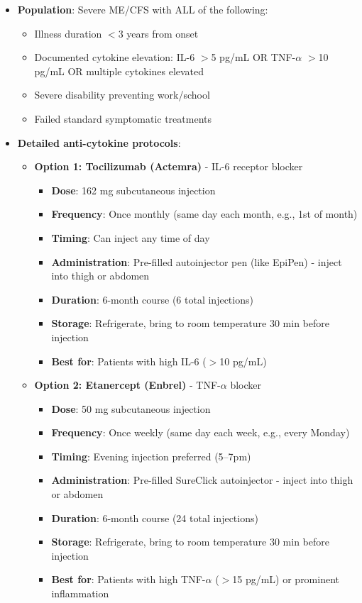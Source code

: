 \begin{itemize}
    \item \textbf{Population}: Severe ME/CFS with ALL of the following:
    \begin{itemize}
        \item Illness duration $<$3 years from onset
        \item Documented cytokine elevation: IL-6 $>$5 pg/mL OR TNF-$\alpha$ $>$10 pg/mL OR multiple cytokines elevated
        \item Severe disability preventing work/school
        \item Failed standard symptomatic treatments
    \end{itemize}

    \item \textbf{Detailed anti-cytokine protocols}:

    \begin{itemize}
        \item \textbf{Option 1: Tocilizumab (Actemra)} - IL-6 receptor blocker
        \begin{itemize}
            \item \textbf{Dose}: 162 mg subcutaneous injection
            \item \textbf{Frequency}: Once monthly (same day each month, e.g., 1st of month)
            \item \textbf{Timing}: Can inject any time of day
            \item \textbf{Administration}: Pre-filled autoinjector pen (like EpiPen) - inject into thigh or abdomen
            \item \textbf{Duration}: 6-month course (6 total injections)
            \item \textbf{Storage}: Refrigerate, bring to room temperature 30 min before injection
            \item \textbf{Best for}: Patients with high IL-6 ($>$10 pg/mL)
        \end{itemize}

        \item \textbf{Option 2: Etanercept (Enbrel)} - TNF-$\alpha$ blocker
        \begin{itemize}
            \item \textbf{Dose}: 50 mg subcutaneous injection
            \item \textbf{Frequency}: Once weekly (same day each week, e.g., every Monday)
            \item \textbf{Timing}: Evening injection preferred (5--7pm)
            \item \textbf{Administration}: Pre-filled SureClick autoinjector - inject into thigh or abdomen
            \item \textbf{Duration}: 6-month course (24 total injections)
            \item \textbf{Storage}: Refrigerate, bring to room temperature 30 min before injection
            \item \textbf{Best for}: Patients with high TNF-$\alpha$ ($>$15 pg/mL) or prominent inflammation
        \end{itemize}
    \end{itemize}


\end{itemize}
